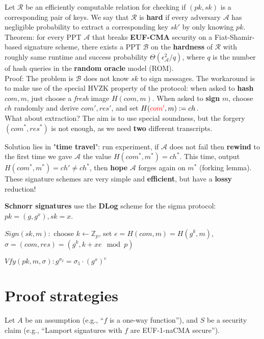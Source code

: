 \documentclass[oneside]{book}
\newcommand{\Z}[0]{\mathbb{Z}}
\newcommand{\cA}[0]{\mathcal{A}}
\newcommand{\cB}[0]{\mathcal{B}}
\newcommand{\epsA}[0]{\epsilon_\cA}
\begin{document}
Let $\mathcal{R}$ be an efficiently computable relation for checking if $(pk, sk)$ is a corresponding pair of keys. We say that $\mathcal{R}$ is \textbf{hard} if every adversary $\cA$ has negligible probability to extract a corresponding key $sk'$ by only knowing $pk$.\\

Theorem: for every PPT $\cA$ that breaks \textbf{EUF-CMA} security on a Fiat-Shamir-based signature scheme, there exists a PPT $\cB$ on the \textbf{hardness} of $\mathcal{R}$ with roughly same runtime and success probability $\Theta(\epsA^2/q)$, where $q$ is the number of hash queries in the \textbf{random oracle} model (ROM).\\

Proof: The problem is $\cB$ does not know $sk$ to sign messages. The workaround is to make use of the special HVZK property of the protocol: when asked to \textbf{hash} $com, m$, just choose a \textit{fresh} image $H(com, m)$. When asked to \textbf{sign} $m$, choose $ch$ randomly and derive $com', res'$, and set $H(\textcolor{red}{com'}, m) := ch$.\\

What about extraction? The aim is to use special soundness, but the forgery $(com^*, res^*)$ is not enough, as we need \textbf{two} different transcripts.

Solution lies in "\textbf{time travel}": run experiment, if $\cA$ does not fail then \textbf{rewind} to the first time we gave $\cA$ the value $H(com^*, m^*) = ch^*$. This time, output $H(com^*, m^*) = ch' \neq ch^*$, then \textbf{hope} $\cA$ forges again on $m^*$ (forking lemma).\\

These signature schemes are very simple and \textbf{efficient}, but have a \textbf{lossy} reduction!

\textbf{Schnorr signatures} use the \textbf{DLog} scheme for the sigma protocol: $pk = (g, g^x), sk = x$.

$Sign(sk, m):$ choose $k \leftarrow \Z_p$, set $e = H(com, m) = H(g^k, m)$, $\sigma = (com, res) = (g^k, k+xe \mod p)$

$Vfy(pk, m, \sigma): g^{\sigma_2} = \sigma_1 \cdot (g^x)^e$

\appendix

\chapter{Proof strategies}

Let $A$ be an assumption (e.g., “$f$ is a one-way function”), and $S$ be a security claim (e.g., “Lamport signatures with $f$ are EUF-1-naCMA secure”).
\end{document}
